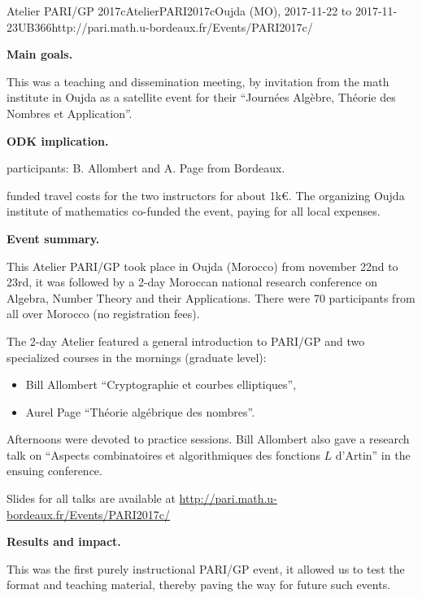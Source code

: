 \begin{event}{Atelier PARI/GP 2017c}{AtelierPARI2017c}{Oujda (MO),
2017-11-22 to 2017-11-23}{UB}{36}{6}{http://pari.math.u-bordeaux.fr/Events/PARI2017c/}

\textbf{Main goals.}

This was a teaching and dissemination meeting, by invitation from the math
institute in Oujda as a satellite event for their ``Journ\'ees Alg\`ebre,
  Th\'eorie des Nombres et Application''.

\textbf{ODK implication.} 

\ODK participants: B. Allombert and A. Page from Bordeaux.

\ODK funded travel costs for the two instructors for about 1k\euro. The
  organizing Oujda institute of mathematics co-funded the event, paying for
  all local expenses.

\textbf{Event summary.} 

This Atelier PARI/GP took place in Oujda (Morocco) from november 22nd to
23rd, it was followed by a 2-day Moroccan national research conference on
  Algebra, Number Theory and their Applications. There were 70 participants
  from all over Morocco (no registration fees).

The 2-day Atelier featured a general introduction to PARI/GP and two 
  specialized courses in the mornings (graduate level):
\begin{itemize}
\item Bill Allombert ``Cryptographie et courbes elliptiques'',
\item Aurel Page ``Th\'eorie alg\'ebrique des nombres''.
\end{itemize}
Afternoons were devoted to practice sessions. Bill Allombert also gave
  a research talk on ``Aspects combinatoires et algorithmiques des fonctions
  $L$ d'Artin'' in the ensuing conference.

Slides for all talks are available at
\url{http://pari.math.u-bordeaux.fr/Events/PARI2017c/}

\textbf{Results and impact.} 

This was the first purely instructional PARI/GP event, it allowed us to test
the format and teaching material, thereby paving the way for future such events.
\end{event}
